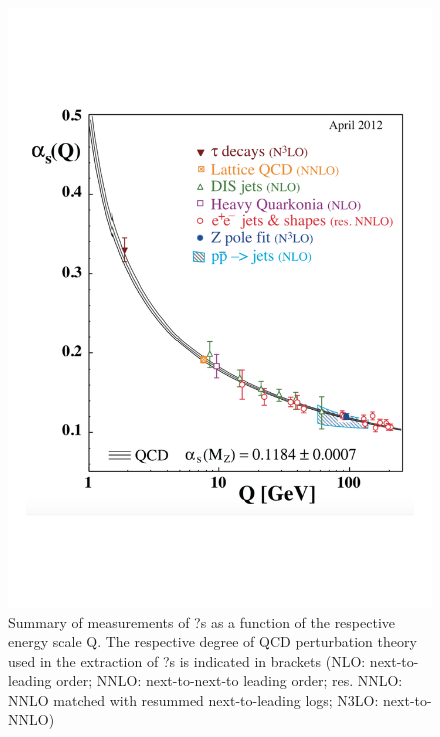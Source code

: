 \begin{figure}[htbp]
\begin{center}
\includegraphics[width=12.cm]{./Version1/FigChapter1/QCD_alpha}
\caption{Summary of measurements of ?s as a function of the respective energy scale Q. The respective degree of QCD perturbation theory used in the extraction of ?s is indicated in brackets (NLO: next-to-leading order; NNLO: next-to-next-to leading order; res. NNLO: NNLO matched with resummed next-to-leading logs; N3LO: next-to-NNLO) \cite{cite:PDG}}
\label{fig:alpha}
\end{center}
\end{figure}

